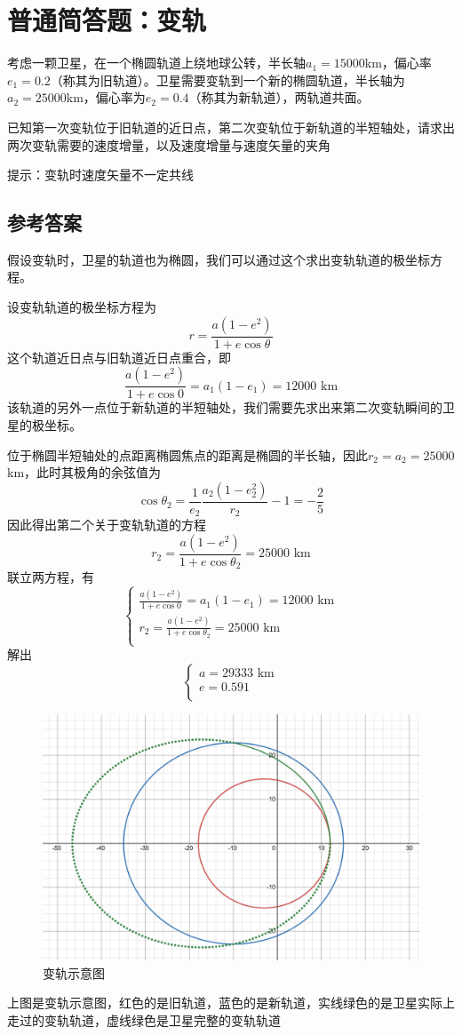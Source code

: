 \documentclass[UTF8]{ctexart}
\numberwithin{equation}{section}
\begin{document}
\newpage
\section{普通简答题：变轨}
考虑一颗卫星，在一个椭圆轨道上绕地球公转，半长轴$a_1 = 15000$km，偏心率$e_1 = 0.2$（称其为旧轨道）。卫星需要变轨到一个新的椭圆轨道，半长轴为$a_2 = 25000$km，偏心率为$e_2 = 0.4$（称其为新轨道），两轨道共面。

已知第一次变轨位于旧轨道的近日点，第二次变轨位于新轨道的半短轴处，请求出两次变轨需要的速度增量，以及速度增量与速度矢量的夹角

提示：变轨时速度矢量不一定共线

\subsection{参考答案}
假设变轨时，卫星的轨道也为椭圆，我们可以通过这个求出变轨轨道的极坐标方程。

设变轨轨道的极坐标方程为
\[
r = \frac{a(1-e^2)}{1+e\cos \theta}
\]
这个轨道近日点与旧轨道近日点重合，即
\[
\frac{a(1-e^2)}{1+e\cos 0} = a_1(1-e_1) = 12000 \text{ km}
\]
该轨道的另外一点位于新轨道的半短轴处，我们需要先求出来第二次变轨瞬间的卫星的极坐标。

位于椭圆半短轴处的点距离椭圆焦点的距离是椭圆的半长轴，因此$r_2 = a_2 = 25000$km，此时其极角的余弦值为
\[
\cos \theta_2 = \frac{1}{e_2} \frac{a_2(1-e^2_2)}{r_2} - 1= -\frac{2}{5}
\]
因此得出第二个关于变轨轨道的方程
\[
r_2 = \frac{a(1-e^2)}{1+e\cos \theta_2} = 25000 \text{ km}
\]
联立两方程，有
\[
\begin{cases}
    \displaystyle
    \frac{a(1-e^2)}{1+e\cos 0} = a_1(1-e_1) = 12000 \text{ km}\\
    \displaystyle
    r_2 = \frac{a(1-e^2)}{1+e\cos \theta_2} = 25000 \text{ km}\\
\end{cases}
\]
解出
\[
\begin{cases}
    a = 29333 \text{ km}\\
    e = 0.591\\
\end{cases}
\]
\begin{figure}[H]
    \centering
    \includegraphics[width = 15cm]{orbitchange.png}
    \caption{变轨示意图}
\end{figure}
上图是变轨示意图，红色的是旧轨道，蓝色的是新轨道，实线绿色的是卫星实际上走过的变轨轨道，虚线绿色是卫星完整的变轨轨道
\end{document}
